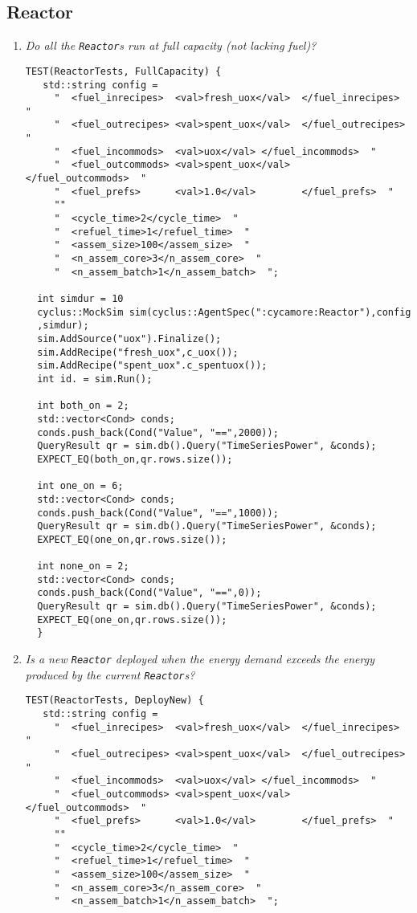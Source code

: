 \documentclass[12pt,letterpaper]{article}
\begin{document}
\subsection{Reactor}
\begin{enumerate}
\item  \textit{Do all the \texttt{Reactor}s run at full capacity (not lacking fuel)?}
\begin{verbatim}
TEST(ReactorTests, FullCapacity) {
   std::string config = 
     "  <fuel_inrecipes>  <val>fresh_uox</val>  </fuel_inrecipes>  "
     "  <fuel_outrecipes> <val>spent_uox</val>  </fuel_outrecipes>  "
     "  <fuel_incommods>  <val>uox</val> </fuel_incommods>  "
     "  <fuel_outcommods> <val>spent_uox</val>      </fuel_outcommods>  "
     "  <fuel_prefs>      <val>1.0</val>        </fuel_prefs>  "
     ""
     "  <cycle_time>2</cycle_time>  "
     "  <refuel_time>1</refuel_time>  "
     "  <assem_size>100</assem_size>  "
     "  <n_assem_core>3</n_assem_core>  "
     "  <n_assem_batch>1</n_assem_batch>  ";

  int simdur = 10 
  cyclus::MockSim sim(cyclus::AgentSpec(":cycamore:Reactor"),config
  ,simdur); 
  sim.AddSource("uox").Finalize();
  sim.AddRecipe("fresh_uox",c_uox());
  sim.AddRecipe("spent_uox".c_spentuox());
  int id. = sim.Run();

  int both_on = 2; 
  std::vector<Cond> conds; 
  conds.push_back(Cond("Value", "==",2000));
  QueryResult qr = sim.db().Query("TimeSeriesPower", &conds);
  EXPECT_EQ(both_on,qr.rows.size());  
  
  int one_on = 6; 
  std::vector<Cond> conds; 
  conds.push_back(Cond("Value", "==",1000));
  QueryResult qr = sim.db().Query("TimeSeriesPower", &conds);
  EXPECT_EQ(one_on,qr.rows.size());  

  int none_on = 2; 
  std::vector<Cond> conds; 
  conds.push_back(Cond("Value", "==",0));
  QueryResult qr = sim.db().Query("TimeSeriesPower", &conds);
  EXPECT_EQ(one_on,qr.rows.size());  
  }
\end{verbatim}

\item \textit{Is a new \texttt{Reactor} deployed when the energy demand exceeds the energy produced by the current \texttt{Reactor}s?} 
\begin{verbatim}
TEST(ReactorTests, DeployNew) {
   std::string config = 
     "  <fuel_inrecipes>  <val>fresh_uox</val>  </fuel_inrecipes>  "
     "  <fuel_outrecipes> <val>spent_uox</val>  </fuel_outrecipes>  "
     "  <fuel_incommods>  <val>uox</val> </fuel_incommods>  "
     "  <fuel_outcommods> <val>spent_uox</val>      </fuel_outcommods>  "
     "  <fuel_prefs>      <val>1.0</val>        </fuel_prefs>  "
     ""
     "  <cycle_time>2</cycle_time>  "
     "  <refuel_time>1</refuel_time>  "
     "  <assem_size>100</assem_size>  "
     "  <n_assem_core>3</n_assem_core>  "
     "  <n_assem_batch>1</n_assem_batch>  ";


\end{verbatim}
\end{enumerate}
\end{document}
